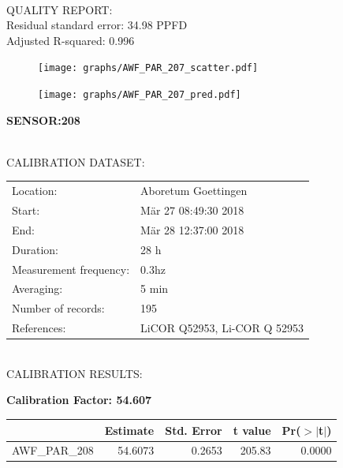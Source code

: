 \documentclass[oneside]{report}
\begin{document}
\hrulefill\\
QUALITY REPORT:\\
Residual standard error: 34.98 PPFD\\
Adjusted R-squared: 0.996



\begin{figure}[H]
  \centering
  \texttt{[image: graphs/AWF\_PAR\_207\_scatter.pdf]}
\end{figure}




\begin{figure}[H]
  \centering
  \texttt{[image: graphs/AWF\_PAR\_207\_pred.pdf]}
\end{figure}

\pagebreak


\begin{center}
\large{\textbf{SENSOR:208}}\\
\end{center}

\hrulefill\\
CALIBRATION DATASET:\\
\begin{table}[h!]
  \centering
  \label{tab:table1}
  \begin{tabular}{ll}
    Location: & Aboretum Goettingen\\ 
    
    
    Start:  & Mär 27 08:49:30 2018 \\
    End:   & Mär 28 12:37:00 2018\\ 
    Duration: & 28 h\\
    Measurement frequency: & 0.3hz\\
    Averaging:  &5 min\\
    Number of records: & 195 \\
    References: & LiCOR Q52953, Li-COR Q 52953 \\
  \end{tabular}
\end{table}

\hrulefill\\
CALIBRATION RESULTS:\\


\begin{center}
\textbf{\large{Calibration Factor: 54.607}}\\
\end{center}
\begin{table}[ht]
\centering
\begin{tabular}{rrrrr}
  \hline
 & Estimate & Std. Error & t value & Pr($>$$|$t$|$) \\ 
  \hline
AWF\_PAR\_208 & 54.6073 & 0.2653 & 205.83 & 0.0000 \\ 
   \hline
\end{tabular}
\end{table}
\end{document}
